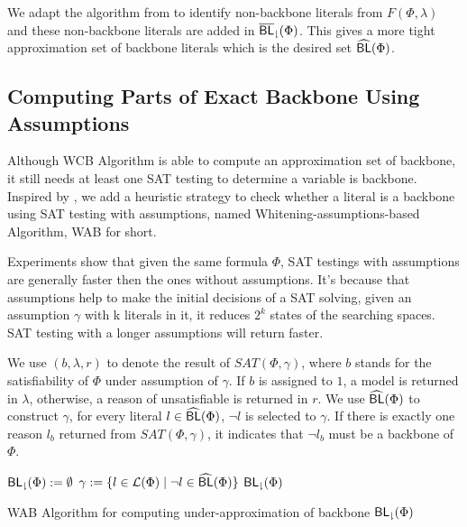 We adapt the algorithm from \cite{Jon75} to identify non-backbone literals from $F(\Phi,\lambda)$ and these non-backbone literals are added in ${\sf \overline{BL}_\downharpoonright}(\Phi)$.
This gives a more tight approximation set of backbone literals which is the desired set ${\sf \widehat{BL}}(\Phi)$.
\fi

\subsection{Computing Parts of Exact Backbone Using Assumptions}

Although WCB Algorithm is able to compute an approximation set of backbone, it still needs at least one SAT testing to determine a variable is backbone. Inspired by \cite{JLM15}, we add a heuristic strategy to check whether a literal is a backbone using SAT testing with assumptions, named Whitening-assumptions-based Algorithm, WAB for short.

Experiments show that given the same formula $\Phi$, SAT testings with assumptions are generally faster then the ones without assumptions. It's because that assumptions help to make the initial decisions of a SAT solving, given an assumption $\gamma$ with k literals in it, it reduces $2^k$ states of the searching spaces. SAT testing with a longer assumptions will return faster.

We use $(b, \lambda, r)$ to denote the result of $SAT(\Phi,\gamma)$, where $b$ stands for the satisfiability of $\Phi$ under assumption of $\gamma$. If $b$ is assigned to $1$, a model is returned in $\lambda$, otherwise, a reason of unsatisfiable is returned in $r$. We use ${\sf \widehat{BL}}(\Phi)$ to construct $\gamma$, for every literal $l\in{\sf \widehat{BL}}(\Phi)$, $\neg l$ is selected to $\gamma$.
If there is exactly one reason $l_b$ returned from $SAT(\Phi,\gamma)$, it indicates that $\neg l_b$ must be a backbone of $\Phi$.


\begin{algorithm2e}
\SetAlgoShortEnd
\SetFillComment
{}
${\sf {BL}_\downharpoonright}(\Phi):=\emptyset$\;
$\gamma:=\{l\in\Lit(\Phi) \mid \neg l\in\BLap(\Phi)\}$\; \label{alg4:init}
\Return ${\sf {BL}_\downharpoonright}(\Phi)$\;
\caption{WAB Algorithm for computing under-approximation of backbone ${\sf {BL}_\downharpoonright}(\Phi)$}
\label{alg:assum}
\end{algorithm2e}

